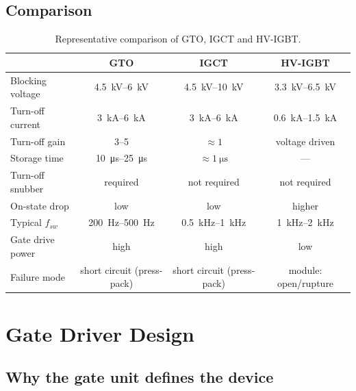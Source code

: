 \subsection{Comparison}

\begin{table}[htbp]
\centering
\caption{Representative comparison of GTO, IGCT and HV-IGBT.}
\label{gtoigct:tab:compare}
\begin{tabular}{lccc}
\toprule
 & \textbf{GTO} & \textbf{IGCT} & \textbf{HV-IGBT} \\
\midrule
Blocking voltage        & \SIrange{4.5}{6}{\kilo\volt} & \SIrange{4.5}{10}{\kilo\volt} & \SIrange{3.3}{6.5}{\kilo\volt} \\
Turn-off current        & \SIrange{3}{6}{\kilo\ampere} & \SIrange{3}{6}{\kilo\ampere}  & \SIrange{0.6}{1.5}{\kilo\ampere} \\
Turn-off gain           & \numrange{3}{5}              & $\approx 1$                   & voltage driven \\
Storage time            & \SIrange{10}{25}{\micro\second} & $\approx\SI{1}{\micro\second}$ & --- \\
Turn-off snubber        & required                     & not required                  & not required \\
On-state drop           & low                          & low                           & higher \\
Typical $f_{sw}$        & \SIrange{200}{500}{\hertz}   & \SIrange{0.5}{1}{\kilo\hertz} & \SIrange{1}{2}{\kilo\hertz} \\
Gate drive power        & high                         & high                          & low \\
Failure mode            & short circuit (press-pack)   & short circuit (press-pack)    & module: open/rupture \\
\bottomrule
\end{tabular}
\end{table}

\section{Gate Driver Design}
\label{gtoigct:ch:gatedriver}

\subsection{Why the gate unit defines the device}

